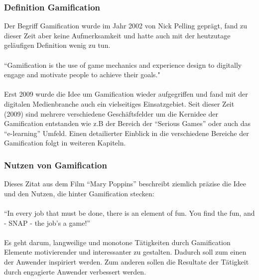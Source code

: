 \documentclass[a4paper,12pt]{scrartcl}
\begin{document}
\subsubsection{Definition Gamification}
Der Begriff Gamification wurde im Jahr 2002 von Nick Pelling geprägt, fand zu dieser Zeit aber keine Aufmerksamkeit und hatte auch mit der heutzutage geläufigen Definition wenig zu tun.
\\\\
“Gamification is the use of game mechanics and experience design to digitally engage and motivate people to achieve their goals."\cite{gamificationDefinition}
\\\\
Erst 2009 wurde die Idee um Gamification wieder aufgegriffen und fand mit der digitalen Medienbranche auch ein vielseitiges Einsatzgebiet. Seit dieser Zeit (2009) sind mehrere verschiedene Geschäftsfelder um die Kernidee der Gamification entstanden wie z.B der Bereich der “Serious Games” oder auch das “e-learning” Umfeld. Einen detailierter Einblick in die verschiedene Bereiche der Gamification folgt in weiteren Kapiteln. 

\subsubsection{Nutzen von Gamification}
Dieses Zitat aus dem Film “Mary Poppins” beschreibt ziemlich präzise die Idee und den Nutzen, die hinter Gamification stecken:\\\\ 
“In every job that must be done, there is an element of fun. You find the fun, and - SNAP - the job's a game!” \footnotemark
{} 
\\\\
Es geht darum, langweilige und monotone Tätigkeiten durch Gamification Elemente motivierender und interessanter zu gestalten. Dadurch soll zum einen der Anwender inspiriert werden. Zum anderen sollen die Resultate der Tätigkeit durch engagierte Anwender verbessert werden.
\end{document}
